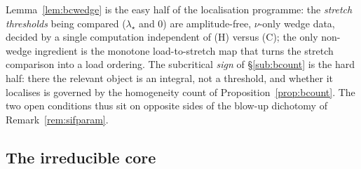 \begin{remark}
    \label{rem:bclocalises}
    Lemma~\ref{lem:bcwedge} is the easy half of the localisation programme: the \emph{stretch thresholds} being
    compared ($\lambda_\star$ and $0$) are amplitude-free, $\nu$-only wedge data, decided by a single computation
    independent of (H) versus (C); the only non-wedge ingredient is the monotone load-to-stretch map that turns the
    stretch comparison into a load ordering. The subcritical \emph{sign} of \S\ref{sub:bcount} is
    the hard half: there the relevant object is an integral, not a threshold, and whether it localises is governed by the
    homogeneity count of Proposition~\ref{prop:bcount}. The two open conditions thus sit on opposite sides of the
    blow-up dichotomy of Remark~\ref{rem:sifparam}.
\end{remark}

\subsection{The irreducible core}
\label{sub:core}

